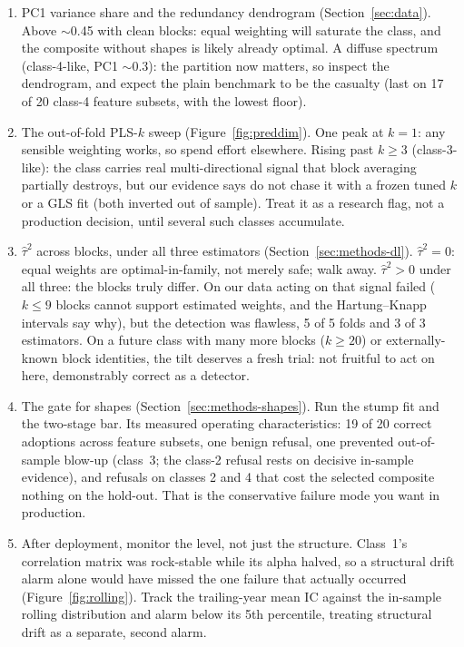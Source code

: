 \documentclass[11pt]{article}
\begin{document}
\begin{enumerate}
\item PC1 variance share and the redundancy dendrogram
      (Section~\ref{sec:data}). Above $\sim$0.45 with clean blocks: equal weighting will
      saturate the class, and the composite without shapes is likely already optimal. A
      diffuse spectrum (class-4-like, PC1 $\sim$0.3): the partition now matters, so
      inspect the dendrogram, and expect the plain benchmark to be the casualty (last on
      17 of 20 class-4 feature subsets, with the lowest floor).
\item The out-of-fold PLS-$k$ sweep (Figure~\ref{fig:preddim}). One peak at
      $k=1$: any sensible weighting works, so spend effort elsewhere. Rising past $k\ge3$
      (class-3-like): the class carries real multi-directional signal that block
      averaging partially destroys, but our evidence says do not chase it with a frozen
      tuned $k$ or a GLS fit (both inverted out of sample). Treat it as a research flag,
      not a production decision, until several such classes accumulate.
\item $\hat\tau^2$ across blocks, under all three estimators
      (Section~\ref{sec:methods-dl}). $\hat\tau^2=0$: equal weights are
      optimal-in-family, not merely safe; walk away. $\hat\tau^2>0$ under all three:
      the blocks truly differ. On our data acting on that signal failed ($k\le9$ blocks
      cannot support estimated weights, and the Hartung--Knapp intervals say why), but
      the detection was flawless, 5 of 5 folds and 3 of 3 estimators. On a future class
      with many more blocks ($k\ge20$) or externally-known block identities, the tilt
      deserves a fresh trial: not fruitful to act on here, demonstrably correct as a
      detector.
\item The gate for shapes (Section~\ref{sec:methods-shapes}). Run the stump fit
      and the two-stage bar. Its measured operating characteristics: 19 of 20 correct
      adoptions across feature subsets, one benign refusal, one prevented out-of-sample
      blow-up (class~3; the class-2 refusal rests on decisive in-sample evidence), and
      refusals on classes 2 and 4 that cost the selected composite nothing on the
      hold-out. That is the conservative failure mode you want in production.
\item After deployment, monitor the level, not just the structure. Class~1's
      correlation matrix was rock-stable while its alpha halved, so a structural drift
      alarm alone would have missed the one failure that actually occurred
      (Figure~\ref{fig:rolling}). Track the trailing-year mean IC against the in-sample
      rolling distribution and alarm below its 5th percentile, treating structural drift
      as a separate, second alarm.
\end{enumerate}
\end{document}
